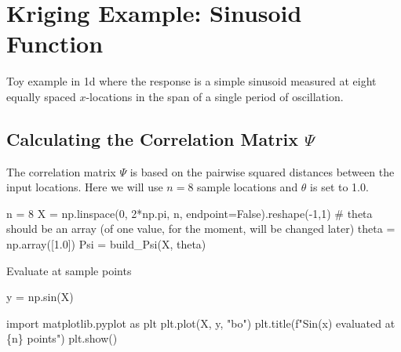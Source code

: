 \documentclass[
  letterpaper,
  DIV=11,
  numbers=noendperiod]{scrreprt}
\newenvironment{Shaded}{\begin{snugshade}}{\end{snugshade}}
\newcommand{\CommentTok}[1]{\textcolor[rgb]{0.37,0.37,0.37}{#1}}
\newcommand{\DecValTok}[1]{\textcolor[rgb]{0.68,0.00,0.00}{#1}}
\newcommand{\FloatTok}[1]{\textcolor[rgb]{0.68,0.00,0.00}{#1}}
\newcommand{\ImportTok}[1]{\textcolor[rgb]{0.00,0.46,0.62}{#1}}
\newcommand{\NormalTok}[1]{\textcolor[rgb]{0.00,0.23,0.31}{#1}}
\newcommand{\OperatorTok}[1]{\textcolor[rgb]{0.37,0.37,0.37}{#1}}
\newcommand{\SpecialCharTok}[1]{\textcolor[rgb]{0.37,0.37,0.37}{#1}}
\newcommand{\SpecialStringTok}[1]{\textcolor[rgb]{0.13,0.47,0.30}{#1}}
\newcommand{\StringTok}[1]{\textcolor[rgb]{0.13,0.47,0.30}{#1}}
\newcommand{\VariableTok}[1]{\textcolor[rgb]{0.07,0.07,0.07}{#1}}
\begin{document}
\section{Kriging Example: Sinusoid
Function}\label{kriging-example-sinusoid-function}

Toy example in 1d where the response is a simple sinusoid measured at
eight equally spaced \(x\)-locations in the span of a single period of
oscillation.

\subsection{\texorpdfstring{Calculating the Correlation Matrix
\(\Psi\)}{Calculating the Correlation Matrix \textbackslash Psi}}\label{calculating-the-correlation-matrix-psi}

The correlation matrix \(\Psi\) is based on the pairwise squared
distances between the input locations. Here we will use \(n=8\) sample
locations and \(\theta\) is set to 1.0.

\begin{Shaded}
\begin{Highlighting}[]
\NormalTok{n }\OperatorTok{=} \DecValTok{8}
\NormalTok{X }\OperatorTok{=}\NormalTok{ np.linspace(}\DecValTok{0}\NormalTok{, }\DecValTok{2}\OperatorTok{*}\NormalTok{np.pi, n, endpoint}\OperatorTok{=}\VariableTok{False}\NormalTok{).reshape(}\OperatorTok{{-}}\DecValTok{1}\NormalTok{,}\DecValTok{1}\NormalTok{)}
\CommentTok{\# theta should be an array (of one value, for the moment, will be changed later)}
\NormalTok{theta }\OperatorTok{=}\NormalTok{ np.array([}\FloatTok{1.0}\NormalTok{])}
\NormalTok{Psi }\OperatorTok{=}\NormalTok{ build\_Psi(X, theta)}
\end{Highlighting}
\end{Shaded}

Evaluate at sample points

\begin{Shaded}
\begin{Highlighting}[]
\NormalTok{y }\OperatorTok{=}\NormalTok{ np.sin(X)}
\end{Highlighting}
\end{Shaded}

\begin{Shaded}
\begin{Highlighting}[]
\ImportTok{import}\NormalTok{ matplotlib.pyplot }\ImportTok{as}\NormalTok{ plt}
\NormalTok{plt.plot(X, y, }\StringTok{"bo"}\NormalTok{)}
\NormalTok{plt.title(}\SpecialStringTok{f"Sin(x) evaluated at }\SpecialCharTok{\{}\NormalTok{n}\SpecialCharTok{\}}\SpecialStringTok{ points"}\NormalTok{)}
\NormalTok{plt.show()}
\end{Highlighting}
\end{Shaded}
\end{document}
